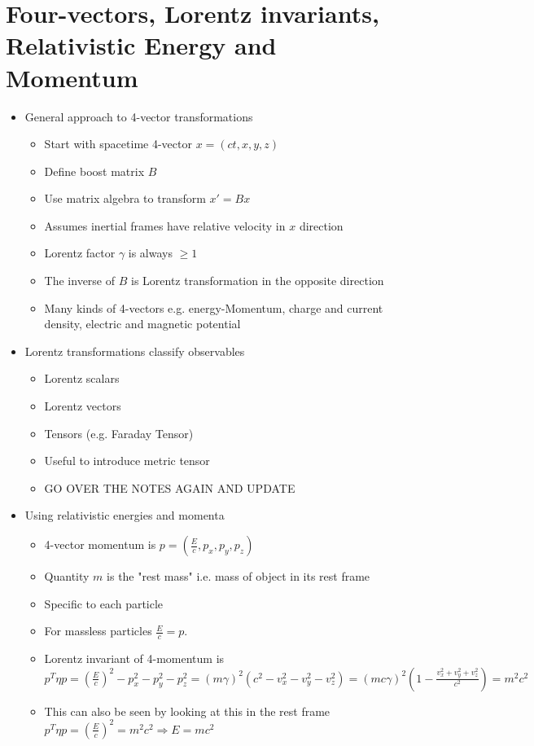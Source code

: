 \documentclass[12pt]{article}
\begin{document}
\section {Four-vectors, Lorentz invariants, Relativistic Energy and Momentum}

\begin{itemize}
    \item General approach to 4-vector transformations \begin{itemize}
        \item Start with spacetime 4-vector $x = (ct, x, y, z)$
        \item Define boost matrix $B$
        \item Use matrix algebra to transform $x' = Bx$
        \item Assumes inertial frames have relative velocity in $x$ direction
        \item Lorentz factor $\gamma$ is always $\geq 1$
        \item The inverse of $B$ is Lorentz transformation in the opposite direction
        \item Many kinds of 4-vectors e.g. energy-Momentum, charge and current density, electric and magnetic potential
    \end{itemize}
    \item Lorentz transformations classify observables \begin{itemize}
    \item Lorentz scalars
    \item Lorentz vectors
    \item Tensors (e.g. Faraday Tensor)
    \item Useful to introduce metric tensor
    \item GO OVER THE NOTES AGAIN AND UPDATE
    \end{itemize}
    \item Using relativistic energies and momenta \begin{itemize}
        \item 4-vector momentum is $p = (\frac{E}{c}, p_x, p_y, p_z)$ 
        \item Quantity $m$ is the "rest mass" i.e. mass of object in its rest frame
        \item Specific to each particle
        \item For massless particles $\frac{E}{c} = p$. 
        \item Lorentz invariant of 4-momentum is $p^T \eta p = (\frac{E}{c})^2 - p_x^2 - p_y^2 - p_z^2 = (m \gamma)^2(c^2-v_x^2-v_y^2-v_z^2) = (mc \gamma)^2 \left( 1 - \frac{v_x^2+v_y^2+v_z^2}{c^2} \right) = m^2c^2$
        \item This can also be seen by looking at this in the rest frame $p^T \eta p = (\frac{E}{c})^2 = m^2c^2 \Rightarrow E = mc^2$
    \end{itemize}
\end{itemize}
\end{document}
